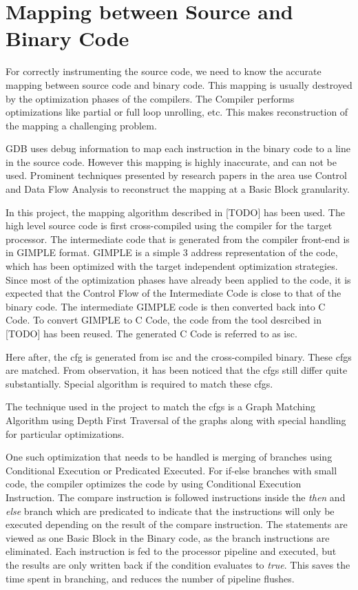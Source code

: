 \section{Mapping between Source and Binary Code}
For correctly instrumenting the source code, we need to know the accurate mapping between source code and binary code. This mapping is usually destroyed by the optimization phases of the compilers. The Compiler performs optimizations like partial or full loop unrolling, etc. %
This makes reconstruction of the mapping a challenging problem.

GDB uses debug information to map each instruction in the binary code to a line in the source code. However this mapping is highly inaccurate, and can not be used. Prominent techniques presented by research papers in the area use Control and Data Flow Analysis to reconstruct the mapping at a Basic Block granularity. 

In this project, the mapping algorithm described in [TODO] has been used. The high level source code is first cross-compiled using the compiler for the target processor. The intermediate code that is generated from the compiler front-end is in GIMPLE format. GIMPLE is a simple 3 address representation of the code, which has been optimized with the target independent optimization strategies. Since most of the optimization phases have already been applied to the code, it is expected that the Control Flow of the Intermediate Code is close to that of the binary code. The intermediate GIMPLE code is then converted back into C Code. To convert GIMPLE to C Code, the code from the tool desrcibed in [TODO] has been reused. The generated C Code is referred to as \gls{isc}.

Here after, the \gls{cfg} is generated from \gls{isc} and the cross-compiled binary. These \gls{cfg}s are matched. From observation, it has been noticed that the \gls{cfg}s still differ quite substantially. Special algorithm is required to match these \gls{cfg}s. 

The technique used in the project to match the \gls{cfg}s is a Graph Matching Algorithm using Depth First Traversal of the graphs along with special handling for particular optimizations. 

One such optimization that needs to be handled is merging of branches using Conditional Execution or Predicated Executed. For if-else branches with small code, the compiler optimizes the code by using Conditional Execution Instruction. The compare instruction is followed instructions inside the \textit{then} and \textit{else} branch which are predicated to indicate that the instructions will only be executed depending on the result of the compare instruction. The statements are viewed as one Basic Block in the Binary code, as the branch instructions are eliminated. Each instruction is fed to the processor pipeline and executed, but the results are only written back if the condition evaluates to \textit{true}. This saves the time spent in branching, and reduces the number of pipeline flushes.

